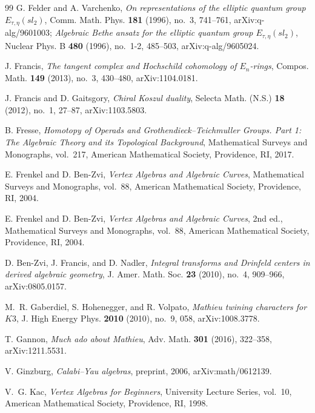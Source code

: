 \begin{thebibliography}{99}
G. Felder and A. Varchenko, \emph{On representations of the elliptic quantum group $E_{\tau,\eta}(sl_2)$}, Comm. Math. Phys. \textbf{181} (1996), no.~3, 741--761, arXiv:q-alg/9601003; \emph{Algebraic Bethe ansatz for the elliptic quantum group $E_{\tau,\eta}(sl_2)$}, Nuclear Phys. B \textbf{480} (1996), no.~1-2, 485--503, arXiv:q-alg/9605024.

J. Francis, \emph{The tangent complex and Hochschild cohomology of $E_n$-rings}, Compos. Math. \textbf{149} (2013), no.~3, 430--480, arXiv:1104.0181.

J. Francis and D. Gaitsgory, \emph{Chiral Koszul duality}, Selecta Math. (N.S.) \textbf{18} (2012), no.~1, 27--87, arXiv:1103.5803.

B. Fresse, \emph{Homotopy of Operads and Grothendieck--Teichmuller Groups. Part 1: The Algebraic Theory and its Topological Background}, Mathematical Surveys and Monographs, vol.~217, American Mathematical Society, Providence, RI, 2017.

E. Frenkel and D. Ben-Zvi, \emph{Vertex Algebras and Algebraic Curves}, Mathematical Surveys and Monographs, vol.~88, American Mathematical Society, Providence, RI, 2004.

E. Frenkel and D. Ben-Zvi, \emph{Vertex Algebras and Algebraic Curves}, 2nd ed., Mathematical Surveys and Monographs, vol.~88, American Mathematical Society, Providence, RI, 2004.

D. Ben-Zvi, J. Francis, and D. Nadler, \emph{Integral transforms and Drinfeld centers in derived algebraic geometry}, J. Amer. Math. Soc. \textbf{23} (2010), no.~4, 909--966, arXiv:0805.0157.


M.~R. Gaberdiel, S. Hohenegger, and R. Volpato, \emph{Mathieu twining characters for $K3$}, J. High Energy Phys. \textbf{2010} (2010), no.~9, 058, arXiv:1008.3778.

T. Gannon, \emph{Much ado about Mathieu}, Adv. Math. \textbf{301} (2016), 322--358, arXiv:1211.5531.

V. Ginzburg, \emph{Calabi--Yau algebras}, preprint, 2006, arXiv:math/0612139.

V.~G. Kac, \emph{Vertex Algebras for Beginners}, University Lecture Series, vol.~10, American Mathematical Society, Providence, RI, 1998.


\end{thebibliography}
